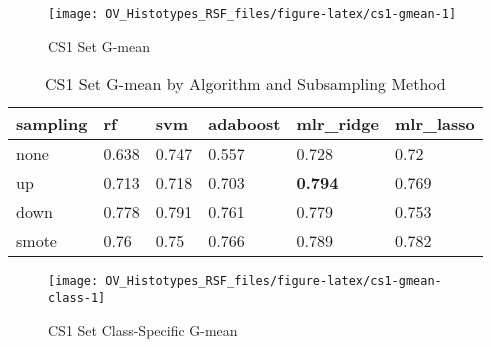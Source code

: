 \documentclass[
]{report}
\begin{document}
\begin{figure}[H]

{\centering \texttt{[image: OV\_Histotypes\_RSF\_files/figure-latex/cs1-gmean-1]} 

}

\caption{CS1 Set G-mean}\label{fig:cs1-gmean}
\end{figure}

\begin{table}

\caption{\label{tab:cs1-gmean-table}CS1 Set G-mean by Algorithm and Subsampling Method}
\centering
\begin{tabular}[t]{l|l|l|l|l|l}
\hline
sampling & rf & svm & adaboost & mlr\_ridge & mlr\_lasso\\
\hline
none & 0.638 & 0.747 & 0.557 & 0.728 & 0.72\\
\hline
up & 0.713 & 0.718 & 0.703 & \textbf{0.794} & 0.769\\
\hline
down & 0.778 & 0.791 & 0.761 & 0.779 & 0.753\\
\hline
smote & 0.76 & 0.75 & 0.766 & 0.789 & 0.782\\
\hline
\end{tabular}
\end{table}

\begin{figure}[H]

{\centering \texttt{[image: OV\_Histotypes\_RSF\_files/figure-latex/cs1-gmean-class-1]} 

}

\caption{CS1 Set Class-Specific G-mean}\label{fig:cs1-gmean-class}
\end{figure}
\end{document}

